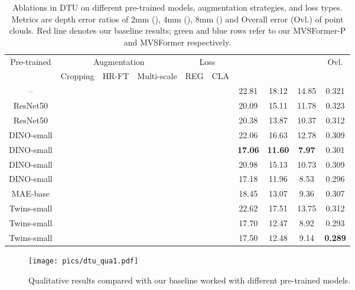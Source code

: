 \documentclass[10pt]{article} \usepackage[preprint]{tmlr}
\begin{document}
\begin{table} \small
\vspace{-0.1in}
\caption{Ablations in DTU on different pre-trained models, augmentation strategies, and loss types. Metrics are depth error ratios of 2mm (), 4mm (), 8mm () and  Overall error (Ovl.) of point clouds. Red line denotes our \textcolor{red!75}{baseline} results; green and blue rows refer to our \textcolor{green!99}{MVSFormer-P} and \textcolor{blue!75}{MVSFormer} respectively.
\label{tab:ablations}}
\small
\centering
\begin{tabular}{c|c|c|c|c|c|c|c|c|c}
\hline 
\multirow{2}{*}{Pre-trained} & \multicolumn{3}{c|}{Augmentation} & \multicolumn{2}{c|}{Loss} & \multirow{2}{*}{} & \multirow{2}{*}{} & \multirow{2}{*}{} & \multirow{2}{*}{Ovl.}\tabularnewline
\cline{2-6} \cline{3-6} \cline{4-6} \cline{5-6} \cline{6-6} 
 & {\scriptsize{}Cropping} & {\scriptsize{}HR-FT} & {\scriptsize{}Multi-scale} & {\scriptsize{}REG} & {\scriptsize{}CLA} &  &  &  & \tabularnewline
\hline 
\rowcolor{red!25}
-- &  &  &  &  &  & 22.81 & 18.12 & 14.85 & 0.321\tabularnewline
ResNet50 &  &  &  &  &  & 20.09 & 15.11 & 11.78 & 0.323\tabularnewline
ResNet50 &  &  &  &  &  & 20.38 & 13.87 & 10.37 & 0.312\tabularnewline
DINO-small &  &  &  &  &  & 22.06 & 16.63 & 12.78 & 0.309\tabularnewline
DINO-small &  &  &  &  &  & \textbf{17.06} & \textbf{11.60} & \textbf{7.97} & 0.301\tabularnewline
DINO-small &  &  &  &  &  & 20.98 & 15.13 & 10.73 & 0.309\tabularnewline
\rowcolor{green!25}
DINO-small &  &  &  &  &  & 17.18 & 11.96 & 8.53 & 0.296\tabularnewline
MAE-base &  &  &  &  &  & 18.45 & 13.07 & 9.36 & 0.307\tabularnewline
Twins-small &  &  &  &  &  & 22.62 & 17.51 & 13.75 & 0.312\tabularnewline
Twins-small &  &  &  &  &  & 17.70 & 12.47 & 8.92 & 0.293\tabularnewline
\rowcolor{blue!25}
Twins-small &  &  &  &  &  & 17.50 & 12.48 & 9.14 & \textbf{0.289}\tabularnewline
\hline 
\end{tabular}
\vspace{-0.1in}
\end{table}

\begin{figure}
\begin{centering}
\texttt{[image: pics/dtu\_qua1.pdf]} 
\par\end{centering}
\caption{Qualitative results compared with our baseline worked with different pre-trained models.}
\label{fig:dtu_qua1}
\vspace{-0.1in}
\end{figure}
\end{document}
